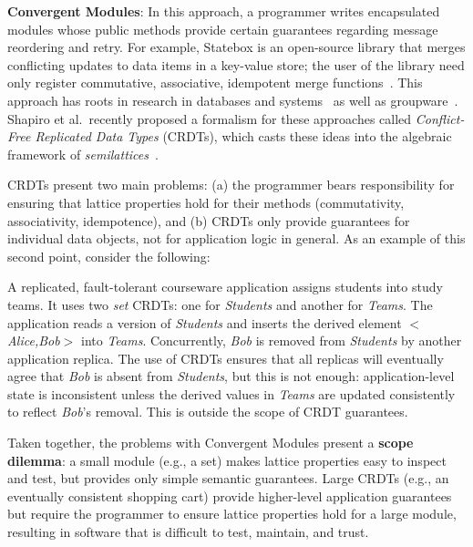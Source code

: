 \vspace{0.5em}\noindent
\textbf{Convergent Modules}: In this approach, a programmer writes encapsulated
modules whose public methods provide certain guarantees regarding message
reordering and retry. For example, Statebox is an open-source library that
merges conflicting updates to data items in a key-value store; the user of the
library need only register commutative, associative, idempotent merge
functions~\cite{statebox}. This approach has roots in research in
databases and systems~\cite{Farrag1989,Garcia-Molina1983,O'Neil1986,Helland2009,Terry1995} as well as
groupware~\cite{Ellis1989,Sun1998}.  Shapiro et al.\ recently proposed a formalism
for these approaches called \emph{Conflict-Free Replicated Data Types} (CRDTs),
which casts these ideas into the algebraic framework of {\em
  semilattices}~\cite{Shapiro2011a,Shapiro2011b}.

CRDTs present two main problems: (a) the programmer bears responsibility for ensuring that lattice properties hold for their methods (commutativity, associativity, idempotence), and (b) CRDTs only provide guarantees for individual data objects, not for application logic in general. As an example of this second point, consider the following:

\vspace{-0.25em}
\begin{example}
A replicated, fault-tolerant courseware application assigns students into study teams.  It uses two \emph{set} CRDTs: one for \emph{Students} and another for \emph{Teams}.  The application reads a version of \emph{Students} and inserts the derived element $<$\emph{Alice,Bob}$>$ into \emph{Teams}. Concurrently, \emph{Bob} is removed from
\emph{Students} by another application replica. The use of CRDTs ensures that all replicas will
eventually agree that \emph{Bob} is absent from \emph{Students}, but this is not enough: application-level state
is inconsistent unless the derived values in \emph{Teams} are updated consistently to reflect \emph{Bob}'s
removal.  This is outside the scope of CRDT guarantees.
\end{example}

\vspace{-.25em}
Taken together, the problems with Convergent Modules present a {\bf scope
  dilemma}: a small module (e.g., a set) makes lattice properties easy to
inspect and test, but provides only simple semantic guarantees. Large CRDTs
(e.g., an eventually consistent shopping cart) provide higher-level application
guarantees but require the programmer to ensure lattice properties hold for a
large module, resulting in software that is difficult to test, maintain, and
trust.
% 

